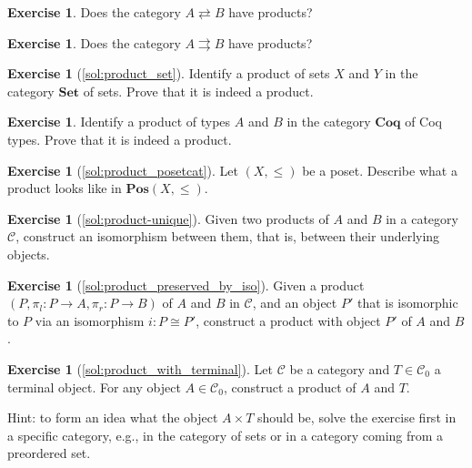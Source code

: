 \documentclass[a4paper,10pt]{scrartcl}
\theoremstyle{plain}
\theoremstyle{definition}
\newtheorem{exer}[thm]{Exercise}
\newcommand{\Cat}[1]{\mathcal{#1}}
\newcommand{\CC}{\Cat{C}}
\newcommand{\Catb}[1]{\mathbf{#1}}
\newcommand{\SET}{\Catb{Set}}
\newcommand{\POS}{\Catb{Pos}}
\newcommand{\COQ}{\Catb{Coq}}
\newcommand{\Ob}[1]{{#1}_0}
\newcommand{\projl}{\ensuremath{\pi_l}}
\newcommand{\projr}{\ensuremath{\pi_r}}
\begin{document}
\begin{exer}
  Does the category $A \rightleftarrows B$ have products?
\end{exer}

\begin{exer}
  Does the category $A \rightrightarrows B$ have products?
\end{exer}


\begin{exer}[\cref{sol:product_set}]\label{exer:product_set}
  Identify a product of sets $X$ and $Y$ in the category $\SET$ of sets.
  Prove that it is indeed a product.
\end{exer}

\begin{exer}
  Identify a product of types $A$ and $B$ in the category $\COQ$ of Coq types.
  Prove that it is indeed a product.
\end{exer}

\begin{exer}[\cref{sol:product_posetcat}]\label{exer:product_posetcat}
  Let $(X,\leq)$ be a poset. Describe what a product looks like in  $\POS(X,\leq)$.
\end{exer}

\begin{exer}[\cref{sol:product-unique}]\label{exer:product-unique}
  Given two products of $A$ and $B$ in a category $\CC$, construct an isomorphism between them, that is, between their underlying objects.
\end{exer}

\begin{exer}[\cref{sol:product_preserved_by_iso}]\label{exer:product_preserved_by_iso}
  Given a product $(P,\projl : P \to A ,\projr : P \to B)$ of $A$ and $B$ in $\CC$, and an object $P'$ that is isomorphic to $P$ via an isomorphism $i : P \cong P'$, construct a product with object $P'$ of $A$ and $B$.
\end{exer}

\begin{exer}[\cref{sol:product_with_terminal}]\label{exer:product_with_terminal} Let $\CC$ be a category and $T\in\Ob{\CC}$ a terminal object.
  For any object $A\in \Ob{\CC}$, construct a product of $A$ and $T$.

  Hint: to form an idea what the object $A \times T$ should be, solve the exercise first in a specific category, e.g., in the category of sets or in a category coming from a preordered set.
\end{exer}
\end{document}
